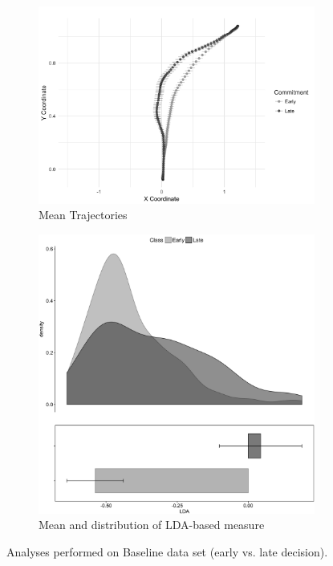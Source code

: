 \documentclass{article}
\begin{document}
\begin{figure}
\centering
\begin{subfigure}[b]{0.45\textwidth}
\includegraphics[width=\textwidth]{TrajectoriesBaseline.png}
\caption{Mean Trajectories}\label{fig:baseline-traj}
\end{subfigure}
\begin{subfigure}[b]{0.45\textwidth}
\includegraphics[width=\textwidth]{lda_distribution_baseline.png}
\caption{Mean and distribution of LDA-based measure}\label{fig:baseline-lda}
\end{subfigure}
\caption{Analyses performed on Baseline data set (early vs. late decision). }
\end{figure}
\end{document}
